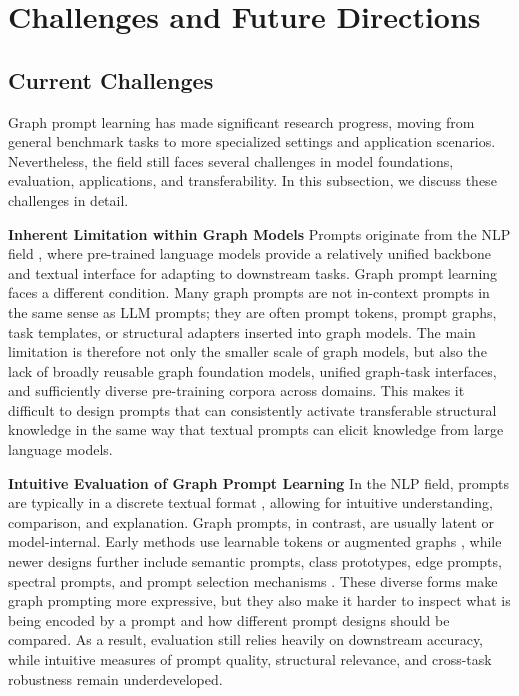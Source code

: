 \section{Challenges and Future Directions}\label{sec:dis}
\subsection{Current Challenges}\label{sec:challenges}
Graph prompt learning has made significant research progress, moving from general benchmark tasks to more specialized settings and application scenarios. Nevertheless, the field still faces several challenges in model foundations, evaluation, applications, and transferability. In this subsection, we discuss these challenges in detail.

\textbf{Inherent Limitation within Graph Models} Prompts originate from the NLP field \cite{brown2020language, lester2021power, liu2023pretrain}, where pre-trained language models provide a relatively unified backbone and textual interface for adapting to downstream tasks. Graph prompt learning faces a different condition. Many graph prompts are not in-context prompts in the same sense as LLM prompts; they are often prompt tokens, prompt graphs, task templates, or structural adapters inserted into graph models. The main limitation is therefore not only the smaller scale of graph models, but also the lack of broadly reusable graph foundation models, unified graph-task interfaces, and sufficiently diverse pre-training corpora across domains. This makes it difficult to design prompts that can consistently activate transferable structural knowledge in the same way that textual prompts can elicit knowledge from large language models.


\textbf{Intuitive Evaluation of Graph Prompt Learning}
In the NLP field, prompts are typically in a discrete textual format \cite{brown2020language, robinson2023leveraging}, allowing for intuitive understanding, comparison, and explanation. Graph prompts, in contrast, are usually latent or model-internal. Early methods use learnable tokens \cite{sun2022gppt, fang2023universal, fang2022prompt, tan2023virtual, ma2023hetgpt} or augmented graphs \cite{sun2023all, huang2023prodigy}, while newer designs further include semantic prompts, class prototypes, edge prompts, spectral prompts, and prompt selection mechanisms \cite{gong2024selfpro, ge2024psp, fu2025edge, yan2024igap, lv2025graphprompter}. These diverse forms make graph prompting more expressive, but they also make it harder to inspect what is being encoded by a prompt and how different prompt designs should be compared. As a result, evaluation still relies heavily on downstream accuracy, while intuitive measures of prompt quality, structural relevance, and cross-task robustness remain underdeveloped.


